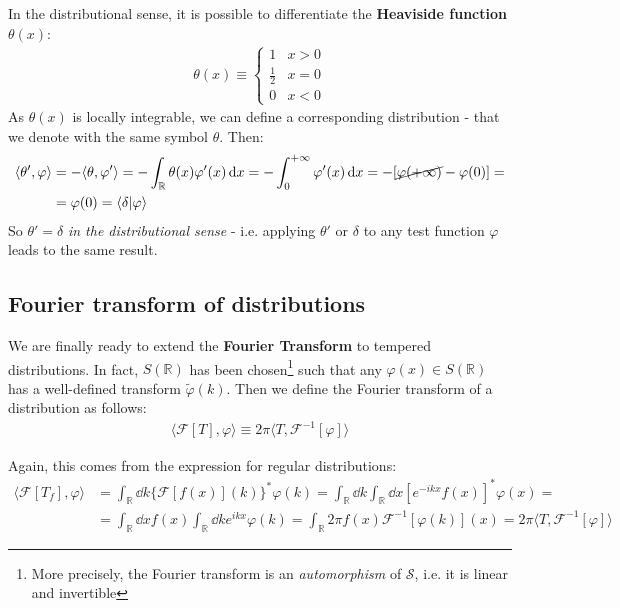 \documentclass[../template.tex]{subfiles}
\begin{document}
\medskip

In the distributional sense, it is possible to differentiate the \textbf{Heaviside function} $\theta(x)$:
\begin{align} \label{eqn:heaviside-def}
    \theta(x) \equiv \begin{cases}
        1 & x > 0\\
        \frac{1}{2} & x=0\\
        0 & x < 0 
    \end{cases}
\end{align}
As $\theta(x)$ is locally integrable, we can define a corresponding distribution - that we denote with the same symbol $\theta$. Then:
\begin{align}\nonumber
    \langle \theta', \varphi \rangle &= - \langle \theta, \varphi' \rangle = -\int_{\mathbb{R}} \theta(x) \varphi'(x) \dd{x} = -\int_0^{+\infty} \varphi'(x) \dd{x} = -[\cancel{\varphi(+\infty)}-\varphi(0)] =\\
    &= \varphi(0) = \langle \delta | \varphi \rangle \label{eqn:theta-deriv}
\end{align}
So $\theta' = \delta$ \textit{in the distributional sense} - i.e. applying $\theta'$ or $\delta$ to any test function $\varphi$ leads to the same result.

\subsection{Fourier transform of distributions}

We are finally ready to extend the \textbf{Fourier Transform} to tempered distributions. In fact, $S(\mathbb{R})$ has been chosen\footnote{More precisely, the Fourier transform is an \textit{automorphism} of $\mathcal{S}$, i.e. it is linear and invertible} such that any $\varphi(x) \in S(\mathbb{R})$ has a well-defined transform $\tilde{\varphi}(k)$. Then we define the Fourier transform of a distribution as follows:
\begin{align*}
    \langle \mathcal{F}[T], \varphi \rangle \equiv 2\pi\langle T, \mathcal{F}^{-1}[\varphi] \rangle
\end{align*}

Again, this comes from the expression for regular distributions:
\begin{align*}
    \langle \mathcal{F}[T_f], \varphi \rangle &= \int_{\mathbb{R}} \dd{k} \{\mathcal{F}[f(x)](k)\}^* \varphi(k) = \int_{\mathbb{R}} \dd{k} \int_{\mathbb{R}} \dd{x} \left[e^{-ikx} f(x)\right]^* \varphi(x) =\\
    &= \int_{\mathbb{R}} \dd{x} f(x) \int_{\mathbb{R}} \dd{k} e^{ikx}  \varphi(k) = \int_{\mathbb{R}} 2\pi f(x) \mathcal{F}^{-1}[\varphi(k)](x) = 2 \pi\langle T, \mathcal{F}^{-1}[\varphi]  \rangle
\end{align*}
\end{document}
